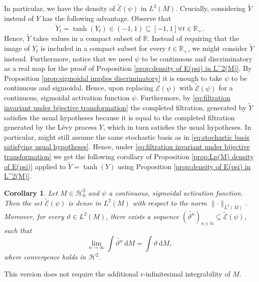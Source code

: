 \documentclass[11pt,a4paper,twoside,openany]{report}
\numberwithin{equation}{section}
\newcommand{\diff}{\mathrm{d}}
\theoremstyle{plain} %
\newtheorem{corollary}[theorem]{Corollary}
\theoremstyle{definition} %
\theoremstyle{remark} %
\begin{document}
In particular, we have the density of \(\widetilde{\mathcal{E}}(\psi)\) in \(L^2(M)\). Crucially, considering \(\widetilde{Y}\) instead of \(Y\) has the following advantage. Observe that
\begin{equation*}
\widetilde{Y}_t=\tanh(Y_t)\in(-1,1)\subseteq[-1,1]\forall t\in\mathbb{R}_+.
\end{equation*}
Hence, \(\widetilde{Y}\) takes values in a compact subset of \(\mathbb{R}\). Instead of requiring that the image of \(Y_t\) is included in a compact subset for every \(t\in\mathbb{R}_+\), we might consider \(\widetilde{Y}\) instead.
Furthermore, notice that we need \(\psi\) to be continuous and discriminatory as a real map for the proof of Proposition \ref{prop:density of E(psi) in L^2(M)}. By Proposition \ref{prop:sigmoidal implies discriminatory}  it is enough to take \(\psi\) to be continuous and sigmoidal. 
Hence, upon replacing \(\mathcal{E}(\psi)\) with \(\widetilde{\mathcal{E}}(\psi)\) for a continuous, sigmoidal activation function \(\psi\).
Furthermore, by \eqref{eq:filtration invariant under bijective transformation} the completed filtration, generated by \(\widetilde{Y}\) satisfies the usual hypotheses because it is equal to the completed filtration generated by the Lévy process \(Y\), which in turn satisfies the usual hypotheses. In particular, might still assume the same stochastic basis as in \eqref{eq:stochastic basis satisfying usual hypotheses}.
Hence, under \eqref{eq:filtration invariant under bijective transformation} we get the following corollary of Proposition \ref{prop:Lp(M) density of E(psi)} applied to \(\widetilde{Y}=\tanh(Y)\) using Proposition \ref{prop:density of E(psi) in L^2(M)}.
\begin{corollary}\label{cor:Lp(M) density of tilde(E)(psi) for change of variables}
    Let \(M\in\mathcal{H}_0^{2}\) and \(\psi\) a continuous, sigmoidal activation function. Then the set \(\widetilde{\mathcal{E}}(\psi)\) is dense in \(L^2(M)\) with respect to the norm \(\lVert\cdot\rVert_{L^2(M)}\). Moreover, for every \(\vartheta\in L^2(M)\), there exists a sequence \((\widetilde{\vartheta^n})_{n\in\mathbb{N}}\subseteq\widetilde{\mathcal{E}}(\psi)\), such that
    \begin{equation*}
        \lim_{n\to\infty}\int \widetilde{\vartheta^n}\,\diff M=\int \vartheta\,\diff M,
    \end{equation*}
    where convergence holds in \(\mathcal{H}^2\). 
\end{corollary}
This version does not require the additional \(\epsilon\)-infinitesimal integrability of \(M\).  
\end{document}
